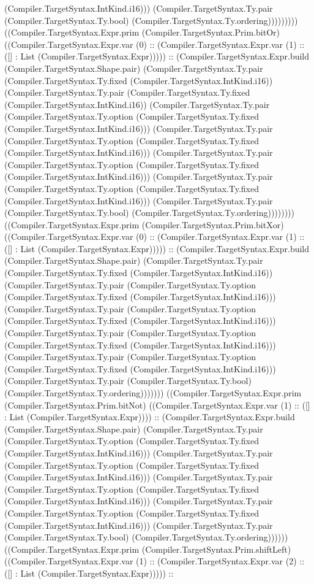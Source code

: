 \documentclass[11pt]{article}
\begin{document}
(Compiler.TargetSyntax.IntKind.i16))) (Compiler.TargetSyntax.Ty.pair (Compiler.TargetSyntax.Ty.bool) (Compiler.TargetSyntax.Ty.ordering))))))))) ((Compiler.TargetSyntax.Expr.prim (Compiler.TargetSyntax.Prim.bitOr) ((Compiler.TargetSyntax.Expr.var (0) :: (Compiler.TargetSyntax.Expr.var (1) :: ([] : List (Compiler.TargetSyntax.Expr))))) :: (Compiler.TargetSyntax.Expr.build (Compiler.TargetSyntax.Shape.pair) (Compiler.TargetSyntax.Ty.pair (Compiler.TargetSyntax.Ty.fixed (Compiler.TargetSyntax.IntKind.i16)) (Compiler.TargetSyntax.Ty.pair (Compiler.TargetSyntax.Ty.fixed (Compiler.TargetSyntax.IntKind.i16)) (Compiler.TargetSyntax.Ty.pair (Compiler.TargetSyntax.Ty.option (Compiler.TargetSyntax.Ty.fixed (Compiler.TargetSyntax.IntKind.i16))) (Compiler.TargetSyntax.Ty.pair (Compiler.TargetSyntax.Ty.option (Compiler.TargetSyntax.Ty.fixed (Compiler.TargetSyntax.IntKind.i16))) (Compiler.TargetSyntax.Ty.pair (Compiler.TargetSyntax.Ty.option (Compiler.TargetSyntax.Ty.fixed (Compiler.TargetSyntax.IntKind.i16))) (Compiler.TargetSyntax.Ty.pair (Compiler.TargetSyntax.Ty.option (Compiler.TargetSyntax.Ty.fixed (Compiler.TargetSyntax.IntKind.i16))) (Compiler.TargetSyntax.Ty.pair (Compiler.TargetSyntax.Ty.bool) (Compiler.TargetSyntax.Ty.ordering)))))))) ((Compiler.TargetSyntax.Expr.prim (Compiler.TargetSyntax.Prim.bitXor) ((Compiler.TargetSyntax.Expr.var (0) :: (Compiler.TargetSyntax.Expr.var (1) :: ([] : List (Compiler.TargetSyntax.Expr))))) :: (Compiler.TargetSyntax.Expr.build (Compiler.TargetSyntax.Shape.pair) (Compiler.TargetSyntax.Ty.pair (Compiler.TargetSyntax.Ty.fixed (Compiler.TargetSyntax.IntKind.i16)) (Compiler.TargetSyntax.Ty.pair (Compiler.TargetSyntax.Ty.option (Compiler.TargetSyntax.Ty.fixed (Compiler.TargetSyntax.IntKind.i16))) (Compiler.TargetSyntax.Ty.pair (Compiler.TargetSyntax.Ty.option (Compiler.TargetSyntax.Ty.fixed (Compiler.TargetSyntax.IntKind.i16))) (Compiler.TargetSyntax.Ty.pair (Compiler.TargetSyntax.Ty.option (Compiler.TargetSyntax.Ty.fixed (Compiler.TargetSyntax.IntKind.i16))) (Compiler.TargetSyntax.Ty.pair (Compiler.TargetSyntax.Ty.option (Compiler.TargetSyntax.Ty.fixed (Compiler.TargetSyntax.IntKind.i16))) (Compiler.TargetSyntax.Ty.pair (Compiler.TargetSyntax.Ty.bool) (Compiler.TargetSyntax.Ty.ordering))))))) ((Compiler.TargetSyntax.Expr.prim (Compiler.TargetSyntax.Prim.bitNot) ((Compiler.TargetSyntax.Expr.var (1) :: ([] : List (Compiler.TargetSyntax.Expr)))) :: (Compiler.TargetSyntax.Expr.build (Compiler.TargetSyntax.Shape.pair) (Compiler.TargetSyntax.Ty.pair (Compiler.TargetSyntax.Ty.option (Compiler.TargetSyntax.Ty.fixed (Compiler.TargetSyntax.IntKind.i16))) (Compiler.TargetSyntax.Ty.pair (Compiler.TargetSyntax.Ty.option (Compiler.TargetSyntax.Ty.fixed (Compiler.TargetSyntax.IntKind.i16))) (Compiler.TargetSyntax.Ty.pair (Compiler.TargetSyntax.Ty.option (Compiler.TargetSyntax.Ty.fixed (Compiler.TargetSyntax.IntKind.i16))) (Compiler.TargetSyntax.Ty.pair (Compiler.TargetSyntax.Ty.option (Compiler.TargetSyntax.Ty.fixed (Compiler.TargetSyntax.IntKind.i16))) (Compiler.TargetSyntax.Ty.pair (Compiler.TargetSyntax.Ty.bool) (Compiler.TargetSyntax.Ty.ordering)))))) ((Compiler.TargetSyntax.Expr.prim (Compiler.TargetSyntax.Prim.shiftLeft) ((Compiler.TargetSyntax.Expr.var (1) :: (Compiler.TargetSyntax.Expr.var (2) :: ([] : List (Compiler.TargetSyntax.Expr))))) :: 
\end{document}

